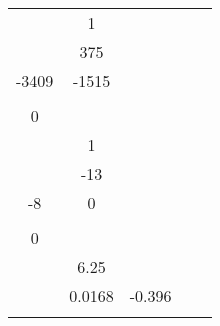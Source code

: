 \documentclass[runningheads,a4paper]{llncs}
\begin{document}
\begin{table}[htb]
\begin{tabular}{|c|c|c|c|c|}
\begin{array}{cc}
0 & 1\\
\end{array}\right]$  & 0        \\ \hline
\begin{tabular}[c]{@{}c@{}}Buck-boost\\ Converter\end{tabular} & $\left[\begin{array}{cc}
0		& 375 \\
-3409	& -1515\\
\end{array}\right]$ & $\left[\begin{array}{c}
125 \\ 0 \\
\end{array}\right]$ & $\left[\begin{array}{cc}
0 & 1\\
\end{array}\right]$ & 0 \\ \hline
\begin{tabular}[c]{@{}c@{}}Automotive\\ Cruise\\ System\end{tabular} & -0.05 & 0.03125 & 0.032 & 0 \\ \hline
\begin{tabular}[c]{@{}c@{}}DC Motor\\ Rate\end{tabular} & $\left[\begin{array}{cc}
-1000		& -13 \\
-8			& 0\\
\end{array}\right]$ & $\left[\begin{array}{c}
4 \\ 0 \\
\end{array}\right]$ & $\left[\begin{array}{cc}
0 & 6.25\\
\end{array}\right]$ & 0 \\ \hline
\begin{tabular}[c]{@{}c@{}}Helicopter\\ Longitudinal\\ Motion\end{tabular}    & $\left[\begin{array}{ccc}
-0.42		& 0.0168		& -0.396	\\

\end{array}
\end{tabular}
\end{table}
\end{document}
